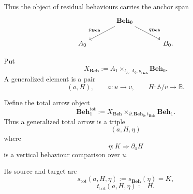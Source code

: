 Thus the object of residual behaviours carries the anchor span
\[
    \begin{tikzcd}[column sep=large]
        &
            \mathbf{Beh}_0
                \arrow[dl, "p_{\mathbf{Beh}}"']
                \arrow[dr, "q_{\mathbf{Beh}}"]
        &
        \\
            A_0
        &
        &
            B_0.
    \end{tikzcd}
\]

\begin{definition}
\label{def:total-behaviour-category}
    Put
    \[
        X_{\mathbf{Beh}}
        :=
        A_1\times_{t_A,A_0,p_{\mathbf{Beh}}}\mathbf{Beh}_0.
    \]
    A generalized element is a pair
    \[
        (a,H),
        \qquad
        a:u\to v,
        \qquad
        H:\mathbb A/v\to\mathbb B.
    \]

    Define the total arrow object
    \[
        \mathbf{Beh}^{\mathrm{tot}}_1
        :=
        X_{\mathbf{Beh}}
        \times_{\partial,\mathbf{Beh}_0,t_{\mathbf{Beh}}}
        \mathbf{Beh}_1.
    \]
    Thus a generalized total arrow is a triple
    \[
        (a,H,\eta)
    \]
    where
    \[
        \eta:K\Rightarrow\partial_aH
    \]
    is a vertical behaviour comparison over \(u\).

    Its source and target are
    \[
        s_{\mathrm{tot}}(a,H,\eta)
        :=
        s_{\mathbf{Beh}}(\eta)=K,
    \]
    \[
        t_{\mathrm{tot}}(a,H,\eta)
        :=
        H.
    \]
\end{definition}


